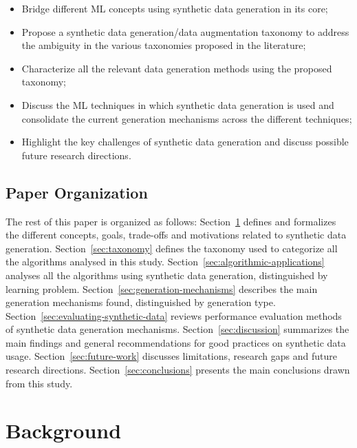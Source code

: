 \documentclass[parskip=full]{scrartcl}
\begin{document}
\begin{itemize}

    \item Bridge different ML concepts using synthetic data generation in its
        core;

    \item Propose a synthetic data generation/data augmentation taxonomy to
        address the ambiguity in the various taxonomies proposed in the
        literature;

    \item Characterize all the relevant data generation methods using the
        proposed taxonomy;

    \item Discuss the ML techniques in which synthetic data generation is used
        and consolidate the current generation mechanisms across the
        different techniques;

    \item Highlight the key challenges of synthetic data generation and
        discuss possible future research directions.

\end{itemize}

\subsection{Paper Organization}

The rest of this paper is organized as follows: Section~\ref{sec:background}
defines and formalizes the different concepts, goals, trade-offs and
motivations related to synthetic data generation. Section~\ref{sec:taxonomy}
defines the taxonomy used to categorize all the algorithms analysed in this
study. Section~\ref{sec:algorithmic-applications} analyses all the algorithms
using synthetic data generation, distinguished by learning problem.
Section~\ref{sec:generation-mechanisms} describes the main generation
mechanisms found, distinguished by generation type.
Section~\ref{sec:evaluating-synthetic-data} reviews performance evaluation
methods of synthetic data generation mechanisms. Section~\ref{sec:discussion}
summarizes the main findings and general recommendations for good practices on
synthetic data usage. Section~\ref{sec:future-work} discusses limitations,
research gaps and future research directions. Section~\ref{sec:conclusions}
presents the main conclusions drawn from this study.

\section{Background}\label{sec:background}
\end{document}
